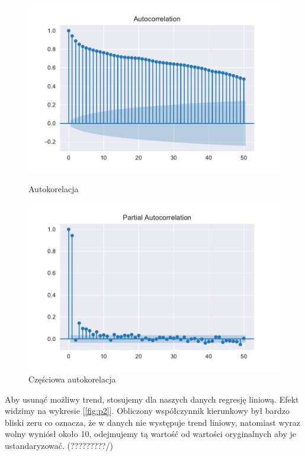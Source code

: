 \documentclass{article}
\theoremstyle{break}
\begin{document}
	\begin{figure}[H]
	\begin{center}
		\begin{minipage}{0.49\linewidth}
			\centering
			\includegraphics[scale=0.49]{acf1.pdf}
			\caption{Autokorelacja}
			\label{fig:acf1}
		\end{minipage}
		\begin{minipage}{0.49\linewidth}
			\centering
			\includegraphics[scale=0.49]{pacf1.pdf}
			\caption{Częściowa autokorelacja}
			\label{fig:pacf1}
		\end{minipage}
	\end{center}
\end{figure}

Aby usunąć możliwy trend, stosujemy dla naszych danych regresję liniową. Efekt widzimy na wykresie [\ref*{fig:p2}]. Obliczony współczynnik kierunkowy był bardzo bliski zeru co oznacza, że w danych nie występuje trend liniowy, natomiast wyraz wolny wyniósł około 10, odejmujemy tą wartość od wartości oryginalnych aby je ustandaryzować. (?????????/)
\end{document}
